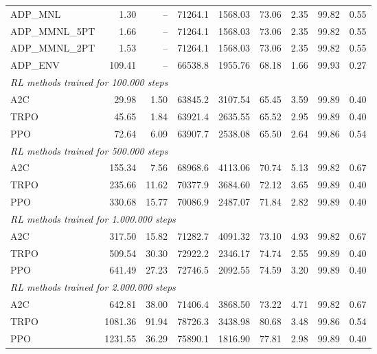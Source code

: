 \begin{samepage}
\begin{center}
\begin{tabular}{l|rr|rr|rr|rr}
    \midrule
    ADP\_MNL     &     1.30 &    -- &    71264.1 &    1568.03 &   73.06 &    2.35 &   99.82 &    0.55 \\
    ADP\_MMNL\_5PT &     1.66 &    -- &    71264.1 &    1568.03 &   73.06 &    2.35 &   99.82 &    0.55 \\
    ADP\_MMNL\_2PT &     1.53 &    -- &    71264.1 &    1568.03 &   73.06 &    2.35 &   99.82 &    0.55 \\
    ADP\_ENV     &   109.41 &    -- &    66538.8 &    1955.76 &   68.18 &    1.66 &   99.93 &    0.27 \\
    \midrule
    \multicolumn{9}{l}{\textit{RL methods trained for 100.000 steps}} \\
    \midrule
    A2C          &    29.98 &     1.50 &    63845.2 &    3107.54 &   65.45 &    3.59 &   99.89 &    0.40 \\
    TRPO         &    45.65 &     1.84 &    63921.4 &    2635.55 &   65.52 &    2.95 &   99.89 &    0.40 \\
    PPO          &    72.64 &     6.09 &    63907.7 &    2538.08 &   65.50 &    2.64 &   99.86 &    0.54 \\
    \midrule
    \multicolumn{9}{l}{\textit{RL methods trained for 500.000 steps}} \\
    \midrule
    A2C          &   155.34 &     7.56 &    68968.6 &    4113.06 &   70.74 &    5.13 &   99.82 &    0.67 \\
    TRPO         &   235.66 &    11.62 &    70377.9 &    3684.60 &   72.12 &    3.65 &   99.89 &    0.40 \\
    PPO          &   330.68 &    15.77 &    70086.9 &    2487.07 &   71.84 &    2.82 &   99.89 &    0.40 \\
    \midrule
    \multicolumn{9}{l}{\textit{RL methods trained for 1.000.000 steps}} \\
    \midrule
    A2C          &   317.50 &    15.82 &    71282.7 &    4091.32 &   73.10 &    4.93 &   99.82 &    0.67 \\
    TRPO         &   509.54 &    30.30 &    72922.2 &    2346.17 &   74.74 &    2.55 &   99.89 &    0.40 \\
    PPO          &   641.49 &    27.23 &    72746.5 &    2092.55 &   74.59 &    3.20 &   99.89 &    0.40 \\
    \midrule
    \multicolumn{9}{l}{\textit{RL methods trained for 2.000.000 steps}} \\
    \midrule
    A2C          &   642.81 &    38.00 &    71406.4 &    3868.50 &   73.22 &    4.71 &   99.82 &    0.67 \\
    TRPO         &  1081.36 &    91.94 &    78726.3 &    3438.98 &   80.68 &    3.48 &   99.86 &    0.54 \\
    PPO          &  1231.55 &    36.29 &    75890.1 &    1816.90 &   77.81 &    2.98 &   99.89 &    0.40 \\
    \bottomrule
  \end{tabular}
\end{center}
\end{samepage}

